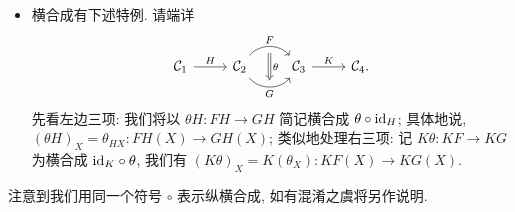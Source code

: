 \begin{itemize}
\[\begin{tikzcd}
	\end{tikzcd} \quad \text{合成为} \quad \begin{tikzcd}
		\mathcal{C}''
		\arrow[bend left=50, rr, "G_1 F_1", ""' name=U]
		\arrow[bend right=50, rr, "" name=D, "G_2 F_2"']
		& & \arrow[Rightarrow, to path=(U) -- (D) \tikztonodes, "\psi \circ \theta"] \mathcal{C} .
	\end{tikzcd} \]
	\item 横合成有下述特例. 请端详
	\[\begin{tikzcd}
		\mathcal{C}_1 \arrow[r, "H"] & \mathcal{C}_2 \arrow[bend left=50, r, "F", ""' name=U] \arrow[bend right=50, r, "" name=D, "G"'] & \mathcal{C}_3 \arrow[Rightarrow, to path=(U)--(D) \tikztonodes, "\theta"] \arrow[r, "K"] & \mathcal{C}_4 .
    \end{tikzcd} \]
	先看左边三项: 我们将以 $\theta H: FH \to GH$ 简记横合成 $\theta \circ \mathrm{id}_{H}$; 具体地说, $(\theta H)_X = \theta_{HX} : FH(X) \to GH(X)$; 类似地处理右三项: 记 $K\theta: KF \to KG$ 为横合成 $\mathrm{id}_K \circ \theta$, 我们有 $(K\theta)_X = K(\theta_X): KF(X) \to KG(X)$.
\end{itemize}
注意到我们用同一个符号 $\circ$ 表示纵横合成, 如有混淆之虞将另作说明.

